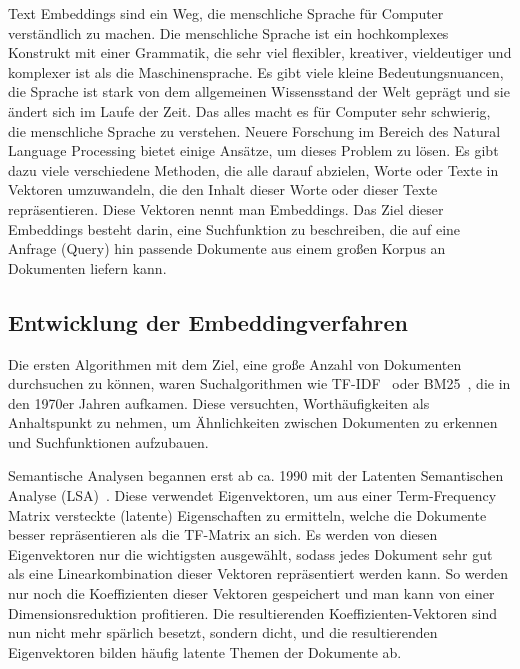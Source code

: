 Text Embeddings sind ein Weg, die menschliche Sprache für Computer verständlich zu machen.
Die menschliche Sprache ist ein hochkomplexes Konstrukt mit einer Grammatik, die sehr viel flexibler, kreativer, vieldeutiger und komplexer ist als die Maschinensprache.
Es gibt viele kleine Bedeutungsnuancen, die Sprache ist stark von dem allgemeinen Wissensstand der Welt geprägt und sie ändert sich im Laufe der Zeit.
Das alles macht es für Computer sehr schwierig, die menschliche Sprache zu verstehen.
Neuere Forschung im Bereich des Natural Language Processing bietet einige Ansätze, um dieses Problem zu lösen.
Es gibt dazu viele verschiedene Methoden, die alle darauf abzielen, Worte oder Texte in Vektoren umzuwandeln, die den Inhalt dieser Worte oder dieser Texte repräsentieren.
Diese Vektoren nennt man Embeddings.
Das Ziel dieser Embeddings besteht darin, eine Suchfunktion zu beschreiben, die auf eine Anfrage (Query) hin passende Dokumente aus einem großen Korpus an Dokumenten liefern kann.

\subsection{Entwicklung der Embeddingverfahren}

Die ersten Algorithmen mit dem Ziel, eine große Anzahl von Dokumenten durchsuchen zu können, waren Suchalgorithmen wie TF-IDF~\cite{sparckjones1972} oder BM25~\cite{harman1995}, die in den 1970er Jahren aufkamen.
Diese versuchten, Worthäufigkeiten als Anhaltspunkt zu nehmen, um Ähnlichkeiten zwischen Dokumenten zu erkennen und Suchfunktionen aufzubauen.

Semantische Analysen begannen erst ab ca. 1990 mit der Latenten Semantischen Analyse (LSA)~\cite{landauer1997}.
Diese verwendet Eigenvektoren, um aus einer Term-Frequency Matrix versteckte (latente) Eigenschaften zu ermitteln, welche die Dokumente besser repräsentieren als die TF-Matrix an sich.
Es werden von diesen Eigenvektoren nur die wichtigsten ausgewählt, sodass jedes Dokument sehr gut als eine Linearkombination dieser Vektoren repräsentiert werden kann.
So werden nur noch die Koeffizienten dieser Vektoren gespeichert und man kann von einer Dimensionsreduktion profitieren.
Die resultierenden Koeffizienten-Vektoren sind nun nicht mehr spärlich besetzt, sondern dicht, und die resultierenden Eigenvektoren bilden häufig latente Themen der Dokumente ab.

